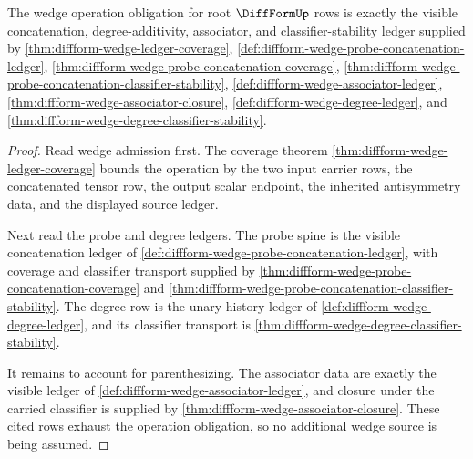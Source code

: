 \begin{theorem}
\label{thm:diffform-root-wedge-operation-obligation}
The wedge operation obligation for root $\DiffFormUp$ rows is exactly the
visible concatenation, degree-additivity, associator, and
classifier-stability ledger supplied by
\autoref{thm:diffform-wedge-ledger-coverage},
\autoref{def:diffform-wedge-probe-concatenation-ledger},
\autoref{thm:diffform-wedge-probe-concatenation-coverage},
\autoref{thm:diffform-wedge-probe-concatenation-classifier-stability},
\autoref{def:diffform-wedge-associator-ledger},
\autoref{thm:diffform-wedge-associator-closure},
\autoref{def:diffform-wedge-degree-ledger}, and
\autoref{thm:diffform-wedge-degree-classifier-stability}.
\end{theorem}
\begin{proof}
Read wedge admission first. The coverage theorem
\autoref{thm:diffform-wedge-ledger-coverage} bounds the operation by the two
input carrier rows, the concatenated tensor row, the output scalar endpoint,
the inherited antisymmetry data, and the displayed source ledger.

Next read the probe and degree ledgers. The probe spine is the visible
concatenation ledger of
\autoref{def:diffform-wedge-probe-concatenation-ledger}, with coverage and
classifier transport supplied by
\autoref{thm:diffform-wedge-probe-concatenation-coverage} and
\autoref{thm:diffform-wedge-probe-concatenation-classifier-stability}. The
degree row is the unary-history ledger of
\autoref{def:diffform-wedge-degree-ledger}, and its classifier transport is
\autoref{thm:diffform-wedge-degree-classifier-stability}.

It remains to account for parenthesizing. The associator data are exactly the
visible ledger of \autoref{def:diffform-wedge-associator-ledger}, and closure
under the carried classifier is supplied by
\autoref{thm:diffform-wedge-associator-closure}. These cited rows exhaust the
operation obligation, so no additional wedge source is being assumed.
\end{proof}

